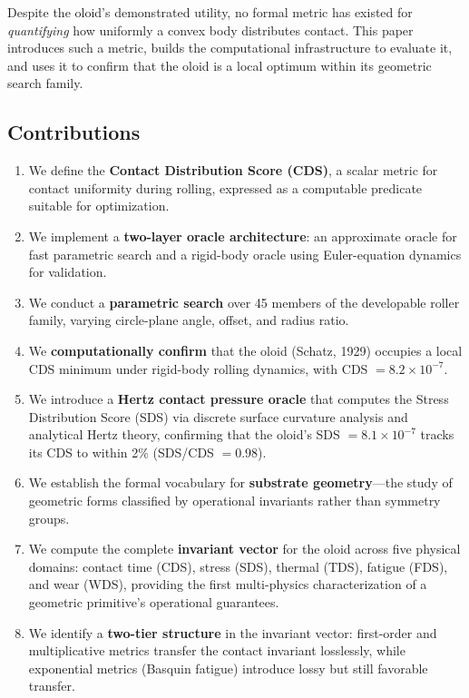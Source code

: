 \documentclass[11pt,a4paper]{article}
\begin{document}
Despite the oloid's demonstrated utility, no formal metric has existed
for \emph{quantifying} how uniformly a convex body distributes contact.
This paper introduces such a metric, builds the computational
infrastructure to evaluate it, and uses it to confirm that the oloid
is a local optimum within its geometric search family.

\subsection{Contributions}

\begin{enumerate}[leftmargin=*]
  \item We define the \textbf{Contact Distribution Score (CDS)}, a
    scalar metric for contact uniformity during rolling, expressed as
    a computable predicate suitable for optimization.
  \item We implement a \textbf{two-layer oracle architecture}:
    an approximate oracle for fast parametric search and a rigid-body
    oracle using Euler-equation dynamics for validation.
  \item We conduct a \textbf{parametric search} over 45 members of the
    developable roller family, varying circle-plane angle, offset,
    and radius ratio.
  \item We \textbf{computationally confirm} that the oloid (Schatz, 1929)
    occupies a local CDS minimum under rigid-body rolling dynamics,
    with CDS $= 8.2 \times 10^{-7}$.
  \item We introduce a \textbf{Hertz contact pressure oracle} that
    computes the Stress Distribution Score (SDS) via discrete surface
    curvature analysis and analytical Hertz theory, confirming that the
    oloid's SDS $= 8.1 \times 10^{-7}$ tracks its CDS to within 2\%
    (SDS/CDS $= 0.98$).
  \item We establish the formal vocabulary for \textbf{substrate
    geometry}---the study of geometric forms classified by operational
    invariants rather than symmetry groups.
  \item We compute the complete \textbf{invariant vector} for the oloid across five physical domains: contact time (CDS), stress (SDS), thermal (TDS), fatigue (FDS), and wear (WDS), providing the first multi-physics characterization of a geometric primitive's operational guarantees.
  \item We identify a \textbf{two-tier structure} in the invariant vector: first-order and multiplicative metrics transfer the contact invariant losslessly, while exponential metrics (Basquin fatigue) introduce lossy but still favorable transfer.
\end{enumerate}
\end{document}
